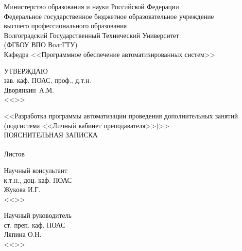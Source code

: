 {
\thispagestyle{empty}
\begin{center}
Министерство образования и науки Российской Федерации\\
Федеральное государственное бюджетное образовательное учреждение\\
высшего профессионального образования\\
Волгоградский Государственный Технический Университет\\
(ФГБОУ ВПО ВолгГТУ) \\
Кафедра <<Программное обеспечение автоматизированных систем>>\\
\end{center}
\vfill
\flushright
\begin{minipage}[c]{15em}
УТВЕРЖДАЮ\\
зав. каф. ПОАС, проф., д.т.н.\\
\makebox[2cm]{\hrulefill}Дворянкин~А.М.\\
<<\makebox[1.5cm]{\hrulefill}>>\makebox[3.5cm]{\hrulefill}\the\year
\end{minipage}
\vspace{8mm}
\begin{center}
<<Разработка программы автоматизации проведения дополнительных занятий (подсистема <<Личный кабинет преподавателя>>)>>\\
\vspace{15mm}
ПОЯСНИТЕЛЬНАЯ ЗАПИСКА\\
\vspace{8mm}
\VSTUDocCode{}\\
\vspace{8mm}
Листов \totalpages\\
\vspace{15mm}
\end{center}
\flushleft\begin{minipage}[c]{15em}
Научный консультант\\
к.т.н., доц. каф. ПОАС\\
\makebox[2cm]{\hrulefill}Жукова И.Г.\\
<<\makebox[1.5cm]{\hrulefill}>>\makebox[3.5cm]{\hrulefill}\the\year
\end{minipage}
\hfill
\begin{minipage}[c]{15em}
Научный руководитель\\
ст. преп. каф. ПОАС\\
\makebox[2cm]{\hrulefill}Ляпина О.Н.\\
<<\makebox[1.5cm]{\hrulefill}>>\makebox[3.5cm]{\hrulefill}\the\year
\end{minipage}
\vspace{8mm}

}
